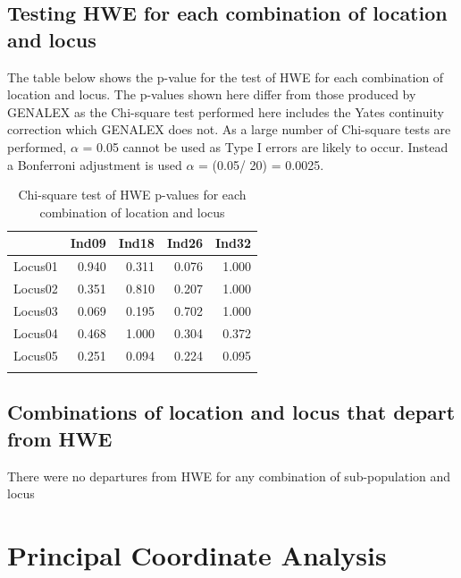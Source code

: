 \documentclass[a4paper]{scrartcl}\usepackage[]{graphicx}\usepackage[]{color}
\begin{document}
\subsection{Testing HWE for each combination of location and locus}



\noindent
The table below shows the p-value for the test of HWE for each combination of location and locus. The p-values shown here differ from those produced by GENALEX as the Chi-square test performed here includes the Yates continuity correction which GENALEX does not. As a large number of Chi-square tests are performed, $\alpha$ = 0.05  cannot be used as Type I errors are likely to occur. Instead a Bonferroni adjustment is used $\alpha$ = (0.05/ 20) = 0.0025.

\begin{table}[ht]
\centering
\begin{tabular}{rrrrr}
  \hline
 & Ind09 & Ind18 & Ind26 & Ind32 \\ 
  \hline
Locus01 & 0.940 & 0.311 & 0.076 & 1.000 \\ 
   \rowcolor[gray]{0.9} Locus02 & 0.351 & 0.810 & 0.207 & 1.000 \\ 
  Locus03 & 0.069 & 0.195 & 0.702 & 1.000 \\ 
   \rowcolor[gray]{0.9} Locus04 & 0.468 & 1.000 & 0.304 & 0.372 \\ 
  Locus05 & 0.251 & 0.094 & 0.224 & 0.095 \\ 
   \rowcolor[gray]{0.9}  \hline
\end{tabular}
\caption{Chi-square test of HWE p-values for each combination of location and locus} 
\end{table}






\FloatBarrier

\subsection{Combinations of location and locus that depart from HWE}

There were no departures from HWE for any combination of sub-population and locus



\FloatBarrier
\section{Principal Coordinate Analysis}
\end{document}
